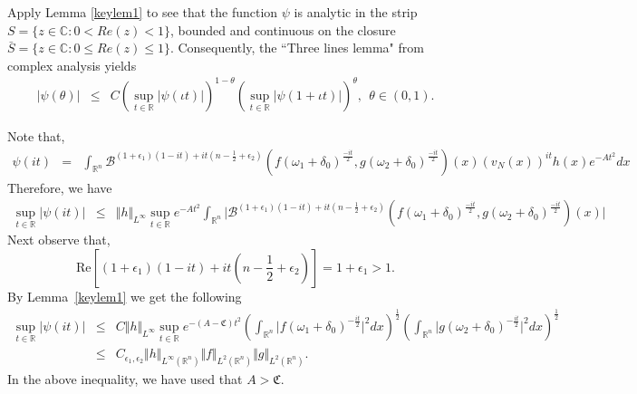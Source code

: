 \documentclass[a4paper,12pt]{amsart}
\newcommand{\R}{{\mathbb {R}}}
\begin{document}
Apply Lemma \ref{keylem1} to see that the function $\psi$ is analytic in the strip $S=\lbrace z\in \mathbb{C} : 0<Re(z)<1\rbrace$,  bounded and continuous on the closure $\bar{S}=\lbrace z\in \mathbb{C} : 0\leq Re(z)\leq 1\rbrace$. Consequently, the ``Three lines lemma" from complex analysis yields
\begin{eqnarray*}
\vert \psi(\theta)\vert
&\leq & C\left(\sup_{t\in \mathbb{R}}\vert \psi(\iota t)\vert\right)^{1-\theta}\left(\sup_{t\in \mathbb{R}}\vert \psi(1+\iota t)\vert\right)^{\theta},~~\theta\in (0,1).
\end{eqnarray*}

Note that, 
\begin{eqnarray*} \psi(i t)
&=& \int_{\R^n} \mathcal {B}^{(1+\epsilon_{1})(1-i t)+i t(n-\frac{1}{2}+\epsilon_{2})}\left(f(\omega_{1}+\delta_{0})^{\frac{-i t}{2}}, g(\omega_{2}+\delta_{0})^{\frac{-i t}{2}} \right)(x)(v_{N}(x))^{i t}h(x)e^{-A t^{2}}dx
\end{eqnarray*} 
Therefore, we have 
 \begin{eqnarray*}
  \sup_{t\in\mathbb{R}}\vert \psi(i t)\vert 
  &\leq &  \Vert h\Vert_{L^{\infty}}\sup_{t\in\mathbb{R}}e^{-At^{2}}\int_{\R^n} \vert \mathcal {B}^{(1+\epsilon_{1})(1-i t)+i t(n-\frac{1}{2}+\epsilon_{2})}\left(f(\omega_{1}+\delta_{0})^{\frac{-i t}{2}}, g(\omega_{2}+\delta_{0})^{\frac{-i t}{2}} \right)(x)\vert
  \end{eqnarray*}
Next observe that, 
$$\text{Re}[(1+\epsilon_{1})(1-i t)+i t(n-\frac{1}{2}+\epsilon_{2})]=1+\epsilon_{1}>1.$$
By Lemma~\ref{keylem1} we get the following
\begin{eqnarray*}
\sup_{t\in\mathbb{R}}\vert \psi(i t)\vert &\leq &
 C\Vert h\Vert_{L^{\infty}}\sup_{t\in\mathbb{R}}e^{-(A-\mathfrak{C})t^{2}}\left(\int_{\R^n} \vert f(\omega_{1}+\delta_{0})^{-\frac{i t}{2}}\vert^{2} dx \right)^{\frac{1}{2}}\left(\int_{\R^n} \vert g(\omega_{2}+\delta_{0})^{-\frac{i t}{2}}\vert^{2} dx \right)^{\frac{1}{2}}\\
&\leq & C_{\epsilon_{1},\epsilon_{2}}\Vert h\Vert_{L^{\infty}(\mathbb{R}^{n})}\Vert f\Vert_{L^{2}(\mathbb{R}^{n})}\Vert g\Vert_{L^{2}(\mathbb{R}^{n})}.
\end{eqnarray*}
In the above inequality, we have used that $A>\mathfrak{C}.$
  
\end{document}
